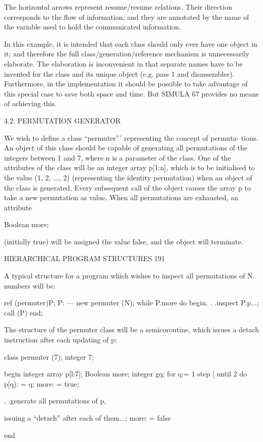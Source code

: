The horizontal arrows represent resume/resume relations. Their direction corresponds to the flow of information; and they are annotated by the name of the variable used to hold the communicated information.

In this example, it is intended that each class should only ever have one object in it; and therefore the full class/generation/reference mechanism is unnecessarily elaborate. The elaboration is inconvenient in that separate names have to be invented for the class and its unique object (e.g. pass 1 and disassembler). Furthermore, in the implementation it should be possible to take advantage of this special case to save both space and time. But SIMULA 67 provides no means of achieving this.

4.2. PERMUTATION GENERATOR

We wish to define a class “permuter”’ representing the concept of permuta- tions. An object of this class should be capable of generating all permutations of the integers between 1 and 7, where n is a parameter of the class. One of the attributes of the class will be an integer array p[1:n], which is to be initialised to the value (1, 2, ..., 2) (representing the identity permutation) when an object of the class is generated. Every subsequent call of the object causes the array p to take a new permutation as value. When all permutations are exhausted, an attribute

Boolean more;

(initially true) will be assigned the value false, and the object will terminate.

HIERARCHICAL PROGRAM STRUCTURES 191

A typical structure for a program which wishes to inspect all permutations of N numbers will be:

ref (permuter)P; P: — new permuter (N); while P.more do begin. . .inspect P.p...; call (P) end;

The structure of the permuter class will be a semicoroutine, which issues a detach instruction after each updating of p:

class permuter (7); integer 7;

begin integer array p[l:7]; Boolean more; integer gq; for q:= 1 step | until 2 do p[q): = q; more: = true;

. .generate all permutations of p,

issuing a “detach” after each of them...; more: = false

end

